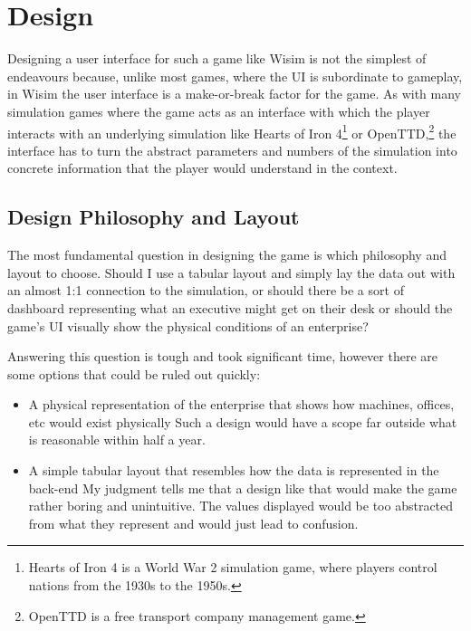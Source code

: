 \section{Design}

Designing a user interface for such a game like Wisim is not the simplest of endeavours because, unlike most games, where the UI is
subordinate to gameplay, in Wisim the user interface is a make-or-break factor for the game. As with many simulation games where
the game acts as an interface with which the player interacts with an underlying simulation like Hearts of Iron 4\footnote{Hearts
	of Iron 4 is a World War 2 simulation game, where players control nations from the 1930s to the 1950s. } or
OpenTTD,\footnote{OpenTTD is a free transport company management game.} the interface has to turn the abstract parameters and numbers
of the simulation into concrete information that the player would understand in the context.

\subsection{Design Philosophy and Layout}

The most fundamental question in designing the game is which philosophy and layout to choose. Should I use a tabular
layout and simply lay the data out with an almost 1:1 connection to the simulation, or should there be a sort of dashboard
representing what an executive might get on their desk or should the game's UI visually show the physical conditions of
an enterprise?

Answering this question is tough and took significant time, however there are some options that could be ruled out
quickly:

\begin{itemize}
	\item A physical representation of the enterprise that shows how machines, offices, etc would exist physically
	      \rightarrow  Such a design would have a scope far outside what is reasonable within half a year.

	\item A simple tabular layout that resembles how the data is represented in the back-end \rightarrow  My judgment tells
	      me that a design like that would make the game rather boring and unintuitive. The values displayed would be too
	      abstracted from what they represent and would just lead to confusion.
\end{itemize}

